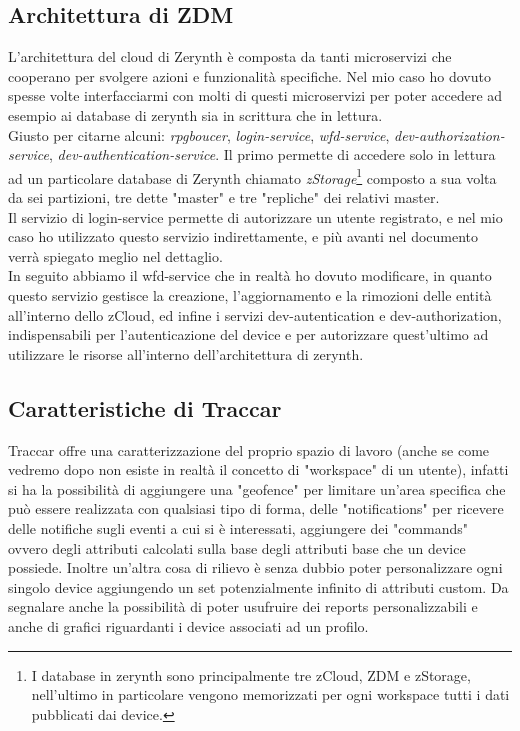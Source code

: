 \documentclass[a4paper,titlepage,12pt]{book}
\begin{document}
\subsection{
\sffamily Architettura di ZDM}
L'architettura del cloud di Zerynth è composta da tanti microservizi che cooperano per svolgere azioni e funzionalità specifiche. Nel mio caso ho dovuto spesse volte interfacciarmi con molti di questi microservizi per poter accedere ad esempio ai database di zerynth sia in scrittura che in lettura. \\
Giusto per citarne alcuni: \textit{rpgboucer}, \textit{login-service}, \textit{wfd-service}, \textit{dev-authorization-service}, \textit{dev-authentication-service}. Il primo permette di accedere solo in lettura ad un particolare database di Zerynth chiamato \textit{zStorage}\footnote{\sffamily I database in zerynth sono principalmente tre zCloud, ZDM e zStorage, nell'ultimo in particolare vengono memorizzati per ogni workspace tutti i dati pubblicati dai device.} composto a sua volta da sei partizioni, tre dette "master" e tre "repliche" dei relativi master.\\
Il servizio di login-service permette di autorizzare un utente registrato, e nel mio caso ho utilizzato questo servizio indirettamente, e più avanti nel documento verrà spiegato meglio nel dettaglio.\\
In seguito abbiamo il wfd-service che in realtà ho dovuto modificare, in quanto questo servizio gestisce la creazione, l'aggiornamento e la rimozioni delle entità all'interno dello zCloud, ed infine i servizi dev-autentication e dev-authorization, indispensabili per l'autenticazione del device e per autorizzare quest'ultimo ad utilizzare le risorse all'interno dell'architettura di zerynth.

\subsection{
\sffamily Caratteristiche di Traccar}
Traccar offre una caratterizzazione del proprio spazio di lavoro (anche se come vedremo dopo non esiste in realtà il concetto di "workspace" di un utente), infatti si ha la possibilità di aggiungere una "geofence" per limitare un'area specifica che può essere realizzata con qualsiasi tipo di forma, delle "notifications" per ricevere delle notifiche sugli eventi a cui si è interessati, aggiungere dei "commands" ovvero degli attributi calcolati sulla base degli attributi base che un device possiede. Inoltre un'altra cosa di rilievo è senza dubbio poter personalizzare ogni singolo device aggiungendo un set potenzialmente infinito di attributi custom. Da segnalare anche la possibilità di poter usufruire dei reports personalizzabili e anche di grafici riguardanti i device associati ad un profilo. \\
\end{document}
